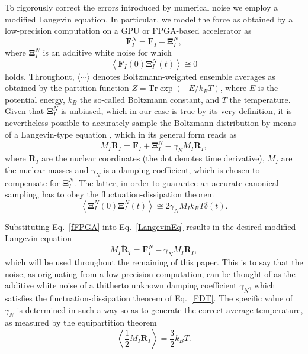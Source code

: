 \documentclass[preprint]{elsarticle}
\begin{document}
To rigorously correct the errors introduced by numerical noise we employ a modified Langevin equation. In particular, we model the force as obtained by a low-precision computation on a GPU or FPGA-based accelerator as
\begin{equation} \label{fFPGA}
\textbf{F}_{I}^{N} = \textbf{F}_{I} + \mathbf{\Xi }_{I}^{N},
\end{equation}
where $\mathbf{\Xi }_{I}^{N}$ is an additive white noise for which
\begin{equation} \label{CrossCorr}
 \left \langle \textbf{F}_{I}\left ( 0 \right ) \mathbf{\Xi } _{I}^{N}\left ( t \right )\right \rangle \cong  0
\end{equation}
holds. Throughout, $\langle \cdots \rangle$ denotes Boltzmann-weighted ensemble averages as obtained by the partition function $Z=\text{Tr} \exp(-E/k_B T)$, where $E$ is the potential energy, $k_B$ the so-called Boltzmann constant, and $T$ the temperature. Given that $\mathbf{\Xi }_{I}^{N}$ is unbiased, which in our case is true by its very definition, it is nevertheless possible to accurately sample the Boltzmann distribution by means of a Langevin-type equation \cite{Krajewski,Richters,Karhan}, which in its general form reads as
\begin{equation} \label{LangevinEq}
M_{I}\ddot{\textbf{R}}_{I}=\textbf{F}_{I}+\mathbf{\Xi }_{I}^{N}-\gamma _{N}M_{I}\dot{\textbf{R}}_{I},
\end{equation}
where $\dot{\textbf{R}}_{I}$ are the nuclear coordinates (the dot denotes time derivative), $M_I$ are the nuclear masses and $\gamma _{N}$ is a damping coefficient,
which is chosen to compensate for \(\mathbf{\Xi }_{I}^{N}\). The latter, in order to guarantee an accurate canonical sampling, has to obey
the fluctuation-dissipation theorem
\begin{equation}
\left \langle \mathbf{\Xi }_{I}^{N}\left ( 0 \right ) \mathbf{\Xi }_{I}^{N}\left ( t \right ) \right \rangle \cong  2 \gamma_{N} M_I k_{B} T  \delta \left ( t \right ).
\label{FDT}
\end{equation}

Substituting Eq.~\ref{fFPGA} into Eq.~\ref{LangevinEq} results in the desired modified Langevin equation
\begin{equation} \label{modLangevin}
M_{I}\ddot{\textbf{R}}_{I} = \textbf{F}_{I}^{N}-\gamma _{N}M_{I}\dot{\textbf{R}}_{I},
\end{equation}
which will be used throughout the remaining of this paper. This is to say that the noise, as originating from a low-precision computation, can be thought of as the additive white noise of a thitherto unknown damping coefficient $\gamma_N$, which satisfies the fluctuation-dissipation theorem of Eq.~\ref{FDT}.  The specific value of $\gamma_N$ is determined in such a way so as to generate the correct average temperature, as measured by the equipartition theorem
\begin{equation}
\left\langle \frac{1}{2} M_I \dot{\textbf{R}}_{I} \right\rangle = \frac{3}{2} k_B T.
\label{EquiPartTheorem}
\end{equation}
\end{document}
